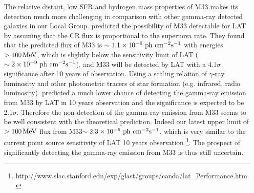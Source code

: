 \documentclass[useAMS,usenatbib,referee]{mn2e}
\begin{document}
The relative distant, low SFR and hydrogen mass properties of M33 makes its detection much more challenging in comparison with other gamma-ray detected galaxies in our Local Group. \citet{pf2001} predicted the possibility of M33 detectable for LAT by assuming that the CR flux is proportional to the supernova rate. They found that the predicted flux of M33 is $\sim \rm 1.1\times 10^{-9}~ph~cm^{-2} s^{-1}$ with energies $>100\,\rm MeV$, which is slightly below the sensitivity limit of LAT ($\sim \rm 2\times 10^{-9}~ph~cm^{-2} s^{-1}$), and M33 will be detected by LAT with a 4.1$\sigma$ significance after 10 years of observation. Using a scaling relation of $\gamma$-ray luminosity and other photometric tracers of star formation (e.g. infrared, radio luminosity). \citet{aaa+2012} predicted a much lower chance of detecting the gamma-ray emission from M33 by LAT in 10 years observation and the significance is expected to be 2.1$\sigma$. Therefore the non-detection of the gamma-ray emission from M33 seems to be well consistent with the theoretical prediction. Indeed our latest upper limit of $>100\,\rm MeV$ flux from M33$\sim {\rm 2.3\times10^{-9}~ph~cm^{-2} s^{-1}}$, which is very similar to the current point source sensitivity of LAT 10 years observation \footnote{http://www.slac.stanford.edu/exp/glast/groups/canda/lat\_Performance.htm}. The prospect of significantly detecting the gamma-ray emission from M33 is thus still uncertain.
\end{document}
